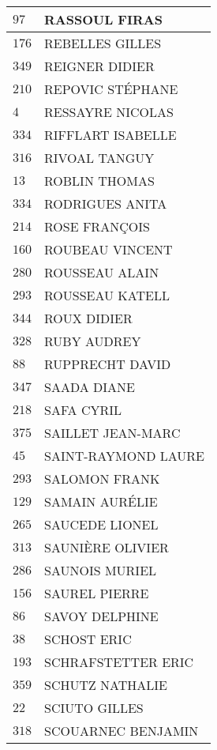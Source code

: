 \begin{xltabular}{\linewidth}{|l|X|}
    \hline
    $97$ & RASSOUL FIRAS \\
    \hline
    $176$ & REBELLES GILLES \\
    \hline
    $349$ & REIGNER DIDIER \\
    \hline
    $210$ & REPOVIC STÉPHANE \\
    \hline
    $4$ & RESSAYRE NICOLAS \\
    \hline
    $334$ & RIFFLART ISABELLE \\
    \hline
    $316$ & RIVOAL TANGUY \\
    \hline
    $13$ & ROBLIN THOMAS \\
    \hline
    $334$ & RODRIGUES ANITA \\
    \hline
    $214$ & ROSE FRANÇOIS \\
    \hline
    $160$ & ROUBEAU VINCENT \\
    \hline
    $280$ & ROUSSEAU ALAIN \\
    \hline
    $293$ & ROUSSEAU KATELL \\
    \hline
    $344$ & ROUX DIDIER \\
    \hline
    $328$ & RUBY AUDREY \\
    \hline
    $88$ & RUPPRECHT DAVID \\
    \hline
    $347$ & SAADA DIANE \\
    \hline
    $218$ & SAFA CYRIL \\
    \hline
    $375$ & SAILLET JEAN-MARC \\
    \hline
    $45$ & SAINT-RAYMOND LAURE \\
    \hline
    $293$ & SALOMON FRANK \\
    \hline
    $129$ & SAMAIN AURÉLIE \\
    \hline
    $265$ & SAUCEDE LIONEL \\
    \hline
    $313$ & SAUNIÈRE OLIVIER \\
    \hline
    $286$ & SAUNOIS MURIEL \\
    \hline
    $156$ & SAUREL PIERRE \\
    \hline
    $86$ & SAVOY DELPHINE \\
    \hline
    $38$ & SCHOST ERIC \\
    \hline
    $193$ & SCHRAFSTETTER ERIC \\
    \hline
    $359$ & SCHUTZ NATHALIE \\
    \hline
    $22$ & SCIUTO GILLES \\
    \hline
    $318$ & SCOUARNEC BENJAMIN \\
    \hline

\end{xltabular}
